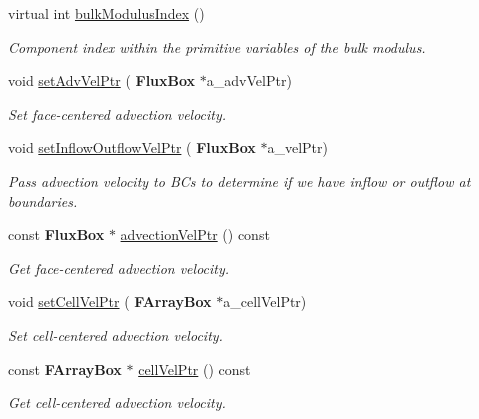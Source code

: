 \begin{DoxyCompactItemize}
virtual int \hyperlink{class_advection_physics_a2d6f7e55296e5701bb52eeea7610b1e5}{bulk\+Modulus\+Index} ()
\begin{DoxyCompactList}\small\item\em Component index within the primitive variables of the bulk modulus. \end{DoxyCompactList}\item 
\mbox{\label{class_advection_physics_a3b6ea2376219a1ff7993a5109c77dcec}} 
void \hyperlink{class_advection_physics_a3b6ea2376219a1ff7993a5109c77dcec}{set\+Adv\+Vel\+Ptr} (\textbf{ Flux\+Box} $\ast$a\+\_\+adv\+Vel\+Ptr)
\begin{DoxyCompactList}\small\item\em Set face-\/centered advection velocity. \end{DoxyCompactList}\item 
\mbox{\label{class_advection_physics_ad499a64afa8af4bd84abdfd21963b2dd}} 
void \hyperlink{class_advection_physics_ad499a64afa8af4bd84abdfd21963b2dd}{set\+Inflow\+Outflow\+Vel\+Ptr} (\textbf{ Flux\+Box} $\ast$a\+\_\+vel\+Ptr)
\begin{DoxyCompactList}\small\item\em Pass advection velocity to B\+Cs to determine if we have inflow or outflow at boundaries. \end{DoxyCompactList}\item 
\mbox{\label{class_advection_physics_a08a8e307ee93ceac5bdc0c225a5f2aef}} 
const \textbf{ Flux\+Box} $\ast$ \hyperlink{class_advection_physics_a08a8e307ee93ceac5bdc0c225a5f2aef}{advection\+Vel\+Ptr} () const
\begin{DoxyCompactList}\small\item\em Get face-\/centered advection velocity. \end{DoxyCompactList}\item 
\mbox{\label{class_advection_physics_af2735891315496f683f06d508c30f80c}} 
void \hyperlink{class_advection_physics_af2735891315496f683f06d508c30f80c}{set\+Cell\+Vel\+Ptr} (\textbf{ F\+Array\+Box} $\ast$a\+\_\+cell\+Vel\+Ptr)
\begin{DoxyCompactList}\small\item\em Set cell-\/centered advection velocity. \end{DoxyCompactList}\item 
\mbox{\label{class_advection_physics_a7762aff59f9da418daa808d602599516}} 
const \textbf{ F\+Array\+Box} $\ast$ \hyperlink{class_advection_physics_a7762aff59f9da418daa808d602599516}{cell\+Vel\+Ptr} () const
\begin{DoxyCompactList}\small\item\em Get cell-\/centered advection velocity. \end{DoxyCompactList}\end{DoxyCompactItemize}
